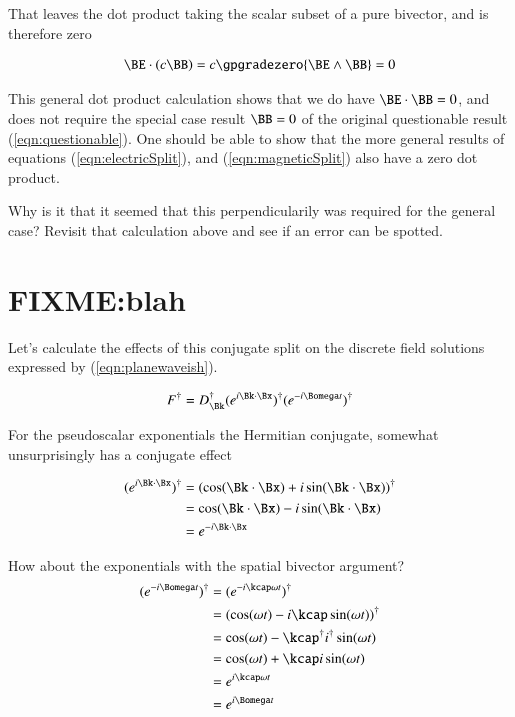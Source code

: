 That leaves the dot product taking the scalar subset of a pure bivector, and
is therefore zero

\begin{align}\label{eqn:blah}
\BE \cdot (c \BB) = {c} \gpgradezero{ \BE \wedge \BB } = 0
\end{align}

This general dot product calculation shows that we do have $\BE \cdot \BB = 0$, and does not require the special case result $\BB = 0$ of the original questionable result (\ref{eqn:questionable}).  One should be able to show that the more general results of equations (\ref{eqn:electricSplit}), and (\ref{eqn:magneticSplit}) also have a zero dot product.

Why is it that it seemed
that this perpendicularily was required for the general case?  Revisit that calculation above and see if an error can be spotted.

\section{FIXME:blah}

Let's calculate the effects of this conjugate split on the discrete field solutions expressed by 
(\ref{eqn:planewaveish}).

\begin{align*}
F^\dagger &= D_\Bk^\dagger (e^{i \Bk \cdot \Bx})^\dagger (e^{-i\Bomega t})^\dagger \\
\end{align*}

For the pseudoscalar exponentials the Hermitian conjugate, somewhat unsurprisingly has a conjugate effect

\begin{align*}
(e^{i \Bk \cdot \Bx})^\dagger
&= 
(\cos(\Bk \cdot \Bx) +i\sin(\Bk \cdot \Bx))^\dagger \\
&= 
\cos(\Bk \cdot \Bx) -i\sin(\Bk \cdot \Bx) \\
&= 
e^{-i\Bk \cdot \Bx}
\end{align*}

How about the exponentials with the spatial bivector argument?
\begin{align*}
(e^{-i\Bomega t})^\dagger 
&=
(e^{-i \kcap \omega t})^\dagger  \\
&=
(\cos(\omega t) - i \kcap \sin(\omega t))^\dagger \\
&=
\cos(\omega t) - \kcap^\dagger i^\dagger \sin(\omega t) \\
&=
\cos(\omega t) + \kcap i \sin(\omega t) \\
&= 
e^{i \kcap \omega t} \\
&= 
e^{i \Bomega t} 
\end{align*}

